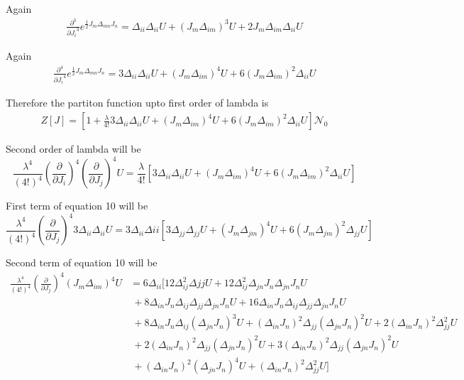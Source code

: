 \documentclass[12pt, letterpaper]{article}
\newcommand*{\1}{\hspace{1pt}}
\begin{document}
    Again    
    \begin{equation}
    \begin{split}
        \frac{\partial^3}{{\partial J_{i}}^3} e^{\frac{1}{2}J_{m}\Delta_{mn}J_{n}} = \Delta_{ii}\Delta_{ii}U + (J_{m}\Delta_{im})^{3} U + 2J_{m}\Delta_{im}\Delta_{ii} U 
    \end{split}
    \end{equation}

    Again    
    \begin{equation}
    \begin{split}
        \frac{\partial^4}{{\partial J_{i}}^4} e^{\frac{1}{2}J_{m}\Delta_{mn}J_{n}} = 3\Delta_{ii}\Delta_{ii}U + (J_{m}\Delta_{im})^{4} U + 6(J_{m}\Delta_{im})^{2}\Delta_{ii} U 
    \end{split}
    \end{equation}

    Therefore the partiton function upto first order of lambda is
    \begin{align}
        Z[J] = [1+\frac{\lambda}{4!}3\Delta_{ii}\Delta_{ii}U + (J_{m}\Delta_{im})^{4} U + 6(J_{m}\Delta_{im})^{2}\Delta_{ii} U]\mathcal{N{_0}}
    \end{align}
    
    Second order of lambda will be
    \begin{equation}
        \frac{\lambda ^4}{(4!)^4}(\frac{\partial}{\partial J_{i}})^{4}(\frac{\partial}{\partial J_{j}})^{4}U = \frac{\lambda}{4!}[3\Delta_{ii}\Delta_{ii}U + (J_{m}\Delta_{im})^{4} U + 6(J_{m}\Delta_{im})^{2}\Delta_{ii} U]
    \end{equation}

    First term of equation 10 will be
    \begin{equation}
        \frac{\lambda ^4}{(4!)^4}(\frac{\partial}{\partial J_{j}})^{4}3\Delta_{ii}\Delta_{ii}U = 3\Delta_{ii}\Delta{ii}[3\Delta_{jj}\Delta_{jj}U + (J_{m}\Delta_{jm})^{4} U + 6(J_{m}\Delta_{jm})^{2}\Delta_{jj} U]
    \end{equation}

    Second term of equation 10 will be
    \begin{align*}
        \frac{\lambda ^4}{(4!)^4}(\frac{\partial}{\partial J_{j}})^{4}(J_{m}\Delta_{im})^{4} U &  = 6\Delta_{ii}[12\Delta_{ij}^{2}\Delta{jj}U + 12\Delta_{ij}^{2}\Delta_{jn}J_{n}\Delta_{jn}J_{n}U \\ 
        & \  + 8\Delta_{in}J_{n}\Delta_{ij}\Delta_{jj}\Delta_{jn}J_{n}U + 16\Delta_{in}J_{n}\Delta_{ij}\Delta_{jj}\Delta_{jn}J_{n}U \\ 
        & \  + 8\Delta_{in}J_{n}\Delta_{ij}(\Delta_{jn}J_{n})^{3}U + (\Delta_{in}J_{n})^{2}\Delta_{jj}(\Delta_{jn}J_{n})^{2}U + 2(\Delta_{in}J_{n})^{2}\Delta_{jj}^{2}U  \\ 
        & \  + 2(\Delta_{in}J_{n})^{2}\Delta_{jj}(\Delta_{jn}J_{n})^{2}U + 3(\Delta_{in}J_{n})^{2}\Delta_{jj}(\Delta_{jn}J_{n})^{2}U \\ 
        & \  + (\Delta_{in}J_{n})^{2}(\Delta_{jn}J_{n})^{4}U + (\Delta_{in}J_{n})^{2}\Delta_{jj}^{2}U ]
    \end{align*}
     
\end{document}
